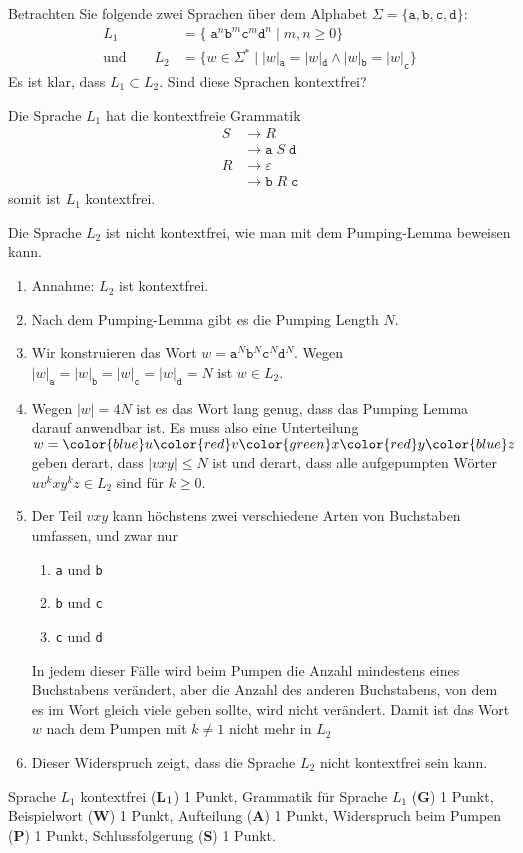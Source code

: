 Betrachten Sie folgende zwei Sprachen über dem Alphabet $\Sigma = \{
\texttt{a},
\texttt{b},
\texttt{c},
\texttt{d}\}$:
\begin{align*}
L_1&=\{\;\texttt{a}^n\texttt{b}^m\texttt{c}^m\texttt{d}^n
\;|\;
m,n\ge 0\}
\\
\text{und}
\qquad
L_2&=\{w\in\Sigma^*
\;|\;
|w|_{\texttt{a}} = |w|_{\texttt{d}}
\wedge
|w|_{\texttt{b}} = |w|_{\texttt{c}}
\}
\end{align*}
Es ist klar, dass $L_1\subset L_2$.
Sind diese Sprachen kontextfrei?


\begin{loesung}
Die Sprache $L_1$ hat die kontextfreie Grammatik
\begin{align*}
S&\to R                             \\
 &\to \texttt{a}\;S\;\texttt{d}     \\
R&\to\varepsilon                    \\
 &\to\texttt{b}\;R\;\texttt{c}
\end{align*}
somit ist $L_1$ kontextfrei.

Die Sprache $L_2$ ist nicht kontextfrei, wie man mit dem Pumping-Lemma
beweisen kann.
\begin{enumerate}
\item
Annahme: $L_2$ ist kontextfrei.
\item
Nach dem Pumping-Lemma gibt es die Pumping Length $N$.
\item
Wir konstruieren das Wort
$w=
\texttt{a}^N
\texttt{b}^N
\texttt{c}^N
\texttt{d}^N$.
Wegen $
|w|_{\texttt{a}}
=
|w|_{\texttt{b}}
=
|w|_{\texttt{c}}
=
|w|_{\texttt{d}}
=N$ ist $w\in L_2$.
\item
Wegen $|w|=4N$ ist es das Wort lang genug, dass das Pumping Lemma darauf
anwendbar ist.
Es muss also eine Unterteilung $w=
{\color{blue}u}
{\color{red}v}
{\color{green}x}
{\color{red}y}
{\color{blue}z}
$ geben derart, dass $|vxy|\le N$ ist und derart, dass alle aufgepumpten
Wörter $uv^kxy^kz\in L_2$ sind für $k\ge 0$.
\item
Der Teil $vxy$ kann höchstens zwei verschiedene Arten von Buchstaben umfassen,
und zwar nur
\begin{enumerate}
\item
\texttt{a} und \texttt{b}
\item
\texttt{b} und \texttt{c}
\item
\texttt{c} und \texttt{d}
\end{enumerate}
In jedem dieser Fälle wird beim Pumpen die Anzahl mindestens eines Buchstabens
verändert,
aber die Anzahl des anderen Buchstabens, von dem es im Wort gleich
viele geben sollte, wird nicht verändert.
Damit ist das Wort $w$ nach dem Pumpen mit $k\ne 1$ nicht mehr in $L_2$
\item
Dieser Widerspruch zeigt, dass die Sprache $L_2$ nicht kontextfrei sein kann.
\qedhere
\end{enumerate}
\end{loesung}

\begin{bewertung}
Sprache $L_1$ kontextfrei ({\bf L}$\mathstrut_1$) 1 Punkt,
Grammatik für Sprache $L_1$ ({\bf G}) 1 Punkt,
Beispielwort ({\bf W}) 1 Punkt,
Aufteilung ({\bf A}) 1 Punkt,
Widerspruch beim Pumpen ({\bf P}) 1 Punkt,
Schlussfolgerung ({\bf S}) 1 Punkt.
\end{bewertung}


